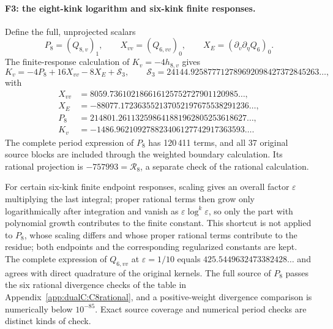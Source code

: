 \documentclass[11pt,a4paper]{article}
\numberwithin{equation}{section}
\begin{document}
\paragraph{F3: the eight-kink logarithm and six-kink finite responses.} Define the full, unprojected scalars
\begin{equation}
 P_8=(Q_{8,v})_1,\qquad X_{vv}=(Q_{6,vv})_0,\qquad X_E=(\partial_v\partial_\eta Q_6)_0 .
\end{equation}
The finite-response calculation of $K_v=-4h_{8,v}$ gives
\begin{equation}
 K_v=-4P_8+16X_{vv}-8X_E+\mathcal S_3,\qquad \mathcal S_3=24144.925877712789692098427372845263\ldots,
\end{equation}
with
\begin{equation}
\begin{aligned}
 X_{vv}&=8059.736102186616125752727901120985\ldots,\\
 X_E&=-88077.172363552137052197675538291236\ldots,\\
 P_8&=214801.261132598641881962805253618627\ldots,\\
 K_v&=-1486.962109278823406127742917363593\ldots .
\end{aligned}
\end{equation}
The complete period expression of $P_8$ has 120\,411 terms, and all 37 original source blocks are included through the
weighted boundary calculation. Its rational projection is $-757993=\mathcal R_8$, a separate check of the rational
calculation.

For certain six-kink finite endpoint responses, scaling gives an overall factor $\varepsilon$ multiplying the last
integral; proper rational terms then grow only logarithmically after integration and vanish as
$\varepsilon\log^k\varepsilon$, so only the part with polynomial growth contributes to the finite constant. This
shortcut is not applied to $P_8$, whose scaling differs and whose proper rational terms contribute to the residue;
both endpoints and the corresponding regularized constants are kept. The complete expression of $Q_{6,vv}$ at
$\varepsilon=1/10$ equals $425.5449632473382428\ldots$ and agrees with direct quadrature of the original kernels. The
full source of $P_8$ passes the six rational divergence checks of the table in Appendix~\ref{app:dualC:C8rational}, and a
positive-weight divergence comparison is numerically below $10^{-85}$. Exact source coverage and numerical period checks
are distinct kinds of check.
\end{document}
